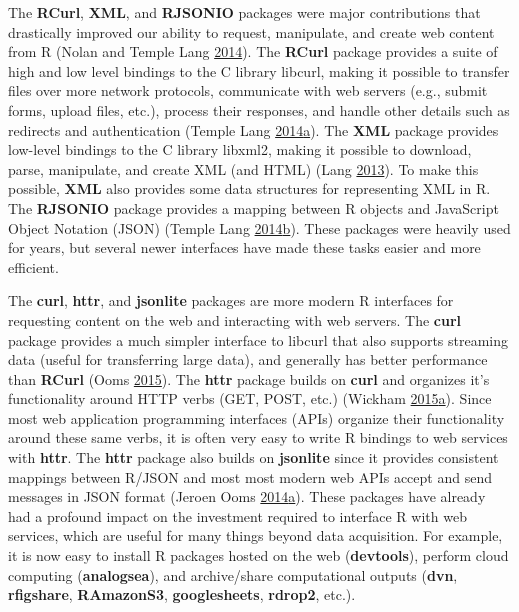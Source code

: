 \documentclass[12pt,]{isuthesis}
\begin{document}
The \textbf{RCurl}, \textbf{XML}, and \textbf{RJSONIO} packages were
major contributions that drastically improved our ability to request,
manipulate, and create web content from R (Nolan and Temple Lang
\protect\hyperlink{ref-nolan-lang}{2014}). The \textbf{RCurl} package
provides a suite of high and low level bindings to the C library
libcurl, making it possible to transfer files over more network
protocols, communicate with web servers (e.g., submit forms, upload
files, etc.), process their responses, and handle other details such as
redirects and authentication (Temple Lang
\protect\hyperlink{ref-RCurl}{2014}\protect\hyperlink{ref-RCurl}{a}).
The \textbf{XML} package provides low-level bindings to the C library
libxml2, making it possible to download, parse, manipulate, and create
XML (and HTML) (Lang \protect\hyperlink{ref-XML}{2013}). To make this
possible, \textbf{XML} also provides some data structures for
representing XML in R. The \textbf{RJSONIO} package provides a mapping
between R objects and JavaScript Object Notation (JSON) (Temple Lang
\protect\hyperlink{ref-RJSONIO}{2014}\protect\hyperlink{ref-RJSONIO}{b}).
These packages were heavily used for years, but several newer interfaces
have made these tasks easier and more efficient.

The \textbf{curl}, \textbf{httr}, and \textbf{jsonlite} packages are
more modern R interfaces for requesting content on the web and
interacting with web servers. The \textbf{curl} package provides a much
simpler interface to libcurl that also supports streaming data (useful
for transferring large data), and generally has better performance than
\textbf{RCurl} (Ooms \protect\hyperlink{ref-curl}{2015}). The
\textbf{httr} package builds on \textbf{curl} and organizes it's
functionality around HTTP verbs (GET, POST, etc.) (Wickham
\protect\hyperlink{ref-httr}{2015}\protect\hyperlink{ref-httr}{a}).
Since most web application programming interfaces (APIs) organize their
functionality around these same verbs, it is often very easy to write R
bindings to web services with \textbf{httr}. The \textbf{httr} package
also builds on \textbf{jsonlite} since it provides consistent mappings
between R/JSON and most most modern web APIs accept and send messages in
JSON format (Jeroen Ooms
\protect\hyperlink{ref-jsonlite}{2014}\protect\hyperlink{ref-jsonlite}{a}).
These packages have already had a profound impact on the investment
required to interface R with web services, which are useful for many
things beyond data acquisition. For example, it is now easy to install R
packages hosted on the web (\textbf{devtools}), perform cloud computing
(\textbf{analogsea}), and archive/share computational outputs
(\textbf{dvn}, \textbf{rfigshare}, \textbf{RAmazonS3},
\textbf{googlesheets}, \textbf{rdrop2}, etc.).
\end{document}
